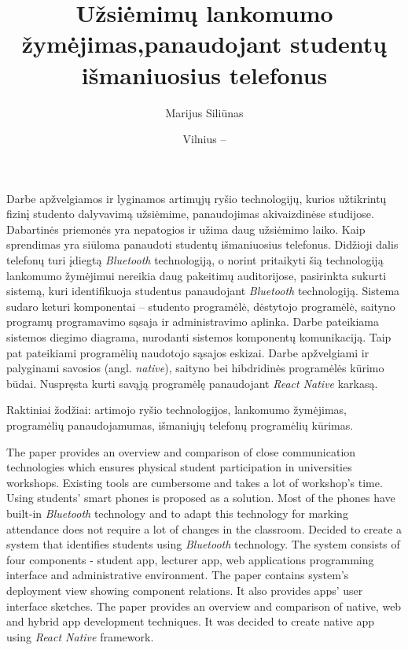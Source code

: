 \documentclass{VUMIFPSbakalaurinis}
\title{Užsiėmimų lankomumo žymėjimas,\break panaudojant studentų išmaniuosius telefonus}
\author{Marijus Siliūnas}
\date{Vilnius – \the\year}
\begin{document}
\maketitle


Darbe apžvelgiamos ir lyginamos artimųjų ryšio technologijų, kurios užtikrintų fizinį studento dalyvavimą užsiėmime, panaudojimas akivaizdinėse studijose. Dabartinės priemonės yra nepatogios ir užima daug užsiėmimo laiko. Kaip sprendimas yra siūloma panaudoti studentų išmaniuosius telefonus. Didžioji dalis telefonų turi įdiegtą \textit{Bluetooth} technologiją, o norint pritaikyti šią technologiją lankomumo žymėjimui nereikia daug pakeitimų auditorijose, pasirinkta sukurti sistemą, kuri identifikuoja studentus panaudojant \textit{Bluetooth} technologiją. Sistema sudaro keturi komponentai – studento programėlė, dėstytojo programėlė, saityno programų programavimo sąsaja ir administravimo aplinka. Darbe pateikiama sistemos diegimo diagrama, nurodanti sistemos komponentų komunikaciją. Taip pat pateikiami programėlių naudotojo sąsajos eskizai. Darbe apžvelgiami ir palyginami savosios (angl. \textit{native}), saityno bei hibdridinės programėlės kūrimo būdai. Nuspręsta kurti savąją programėlę panaudojant \textit{React Native} karkasą.

Raktiniai žodžiai: artimojo ryšio technologijos, lankomumo žymėjimas, programėlių panaudojamumas, išmaniųjų telefonų programėlių kūrimas.


The paper provides an overview and comparison of close communication technologies which ensures physical student participation in universities workshops.
Existing tools are cumbersome and takes a lot of workshop's time. Using students' smart phones is proposed as a solution. Most of the phones have built-in \textit{Bluetooth} technology and to adapt this technology for marking attendance does not require a lot of changes in the classroom. Decided to create a system that identifies students using \textit{Bluetooth} technology. The system consists of four components - student app, lecturer app, web applications programming interface and administrative environment. The paper contains system's deployment view showing component relations. It also provides apps' user interface sketches. The paper provides an overview and comparison of native, web and hybrid app development techniques. It was decided to create native app using \textit{React Native} framework.
\end{document}
